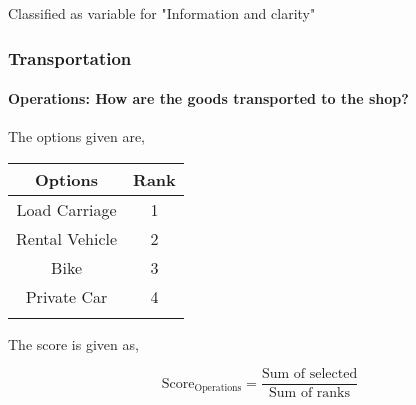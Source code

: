 \documentclass[oneside,twocolumn]{article}
\newcommand{\tsub}[2]{\text{#1}_{\text{#2}}}
\newcommand{\dsub}[2]{\dfrac{\text{#1}}{\text{#2}}}
\newcommand{\multsel}[1]
{
	\[
		\tsub{Score}{#1} = \dsub{Sum of selected}{Sum of ranks}
	\]
}
\newenvironment{ttable}
{
\begin{center}
\begin{tabular}{c|c}
\hline
}
{
\\ \hline
\end{tabular}
\end{center}
}
\begin{document}
Classified as variable for "Information and         clarity"
\subsubsection{Transportation}

\paragraph{Operations: How are the goods transported to the shop?}

The options given are,
\begin{ttable}
Options & Rank \\ \hline
Load Carriage & 1 \\
Rental Vehicle & 2 \\
Bike & 3 \\
Private Car & 4 \\
\hline
\end{ttable}
The score is given as,
\multsel{Operations}
\end{document}
